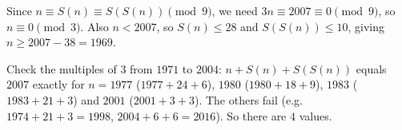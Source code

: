 Since $n\equiv S(n)\equiv S(S(n))\pmod9$, we need $3n\equiv2007\equiv0\pmod 9$, so $n\equiv0\pmod3$. Also $n<2007$, so $S(n)\le28$ and $S(S(n))\le10$, giving $n\ge2007-38=1969$.

Check the multiples of $3$ from $1971$ to $2004$: $n+S(n)+S(S(n))$ equals $2007$ exactly for $n=1977$ ($1977+24+6$), $1980$ ($1980+18+9$), $1983$ ($1983+21+3$) and $2001$ ($2001+3+3$). The others fail (e.g. $1974+21+3=1998$, $2004+6+6=2016$). So there are $\boxed{4}$ values.
